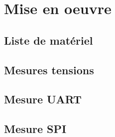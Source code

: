 \section{Mise en oeuvre}

\subsection{Liste de matériel}
{
	
}

\subsection{Mesures tensions}
{

}

\subsection{Mesure UART}
{

}

\subsection{Mesure SPI}
{

}

